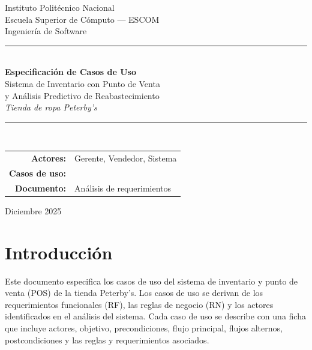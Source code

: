 \documentclass[11pt]{article}
\begin{document}
\begin{titlepage}
\centering
\vspace*{1.2cm}
{\sffamily\large Instituto Politécnico Nacional}\\[0.2cm]
{\sffamily Escuela Superior de Cómputo --- ESCOM}\\[0.2cm]
{\sffamily Ingeniería de Software}\\[2.2cm]

{\color{rule}\rule{\linewidth}{0.8pt}}\\[0.6cm]
{\Huge\sffamily\bfseries\color{brand} Especificación de Casos de Uso}\\[0.5cm]
{\large\sffamily Sistema de Inventario con Punto de Venta\\ y Análisis Predictivo de Reabastecimiento}\\[0.3cm]
{\large\sffamily\itshape Tienda de ropa Peterby's}\\[0.4cm]
{\color{rule}\rule{\linewidth}{0.8pt}}\\[1.6cm]

\begin{tabular}{rl}
\sffamily\bfseries Actores: & \sffamily Gerente, Vendedor, Sistema \\[0.2cm]
\sffamily\bfseries Casos de uso: & \sffamily 16 \\[0.2cm]
\sffamily\bfseries Documento: & \sffamily Análisis de requerimientos \\
\end{tabular}

\vfill
{\sffamily\small Diciembre 2025}
\end{titlepage}

\tableofcontents
\clearpage

\section{Introducción}
Este documento especifica los casos de uso del sistema de inventario y punto de
venta (POS) de la tienda Peterby's. Los casos de uso se derivan de los
requerimientos funcionales (RF), las reglas de negocio (RN) y los actores
identificados en el análisis del sistema. Cada caso de uso se describe con una
ficha que incluye actores, objetivo, precondiciones, flujo principal, flujos
alternos, postcondiciones y las reglas y requerimientos asociados.
\end{document}
